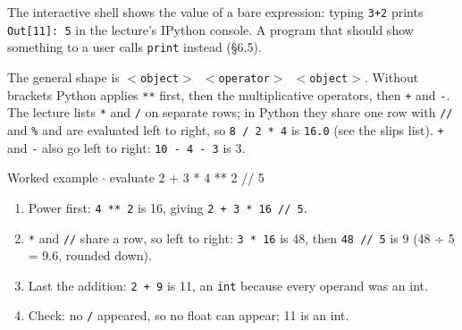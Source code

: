 \documentclass[11pt]{article}
\begin{document}
\begin{keepsection}
\begin{center}
\begin{minipage}[t]{0.950\linewidth}\centering
{}\par{}\end{minipage}
\end{center}

The interactive shell shows the value of a bare expression: typing \texttt{3+2} prints \texttt{Out[11]: 5} in the lecture’s IPython console. A program that should show something to a user calls \texttt{print} instead (§6.5).

The general shape is \texttt{\ensuremath{<}object\ensuremath{>} \ensuremath{<}operator\ensuremath{>} \ensuremath{<}object\ensuremath{>}}. Without brackets Python applies \texttt{**} first, then the multiplicative operators, then \texttt{+} and \texttt{-}. The lecture lists \texttt{*} and \texttt{/} on separate rows; in Python they share one row with \texttt{//} and \texttt{\%} and are evaluated left to right, so \texttt{8 / 2 * 4} is \texttt{16.0} (see the slips list). \texttt{+} and \texttt{-} also go left to right: \texttt{10 - 4 - 3} is 3.

\begin{workedbox}{Worked example \ensuremath{\cdot} evaluate 2 + 3 * 4 ** 2 // 5}
\begin{enumerate}
\item Power first: \texttt{4 ** 2} is 16, giving \texttt{2 + 3 * 16 // 5}.
\item \texttt{*} and \texttt{//} share a row, so left to right: \texttt{3 * 16} is 48, then \texttt{48 // 5} is 9 (48 ÷ 5 = 9.6, rounded down).
\item Last the addition: \texttt{2 + 9} is 11, an \texttt{int} because every operand was an int.
\item Check: no \texttt{/} appeared, so no float can appear; 11 is an int.
\end{enumerate}
\end{workedbox}


\end{keepsection}
\end{document}
